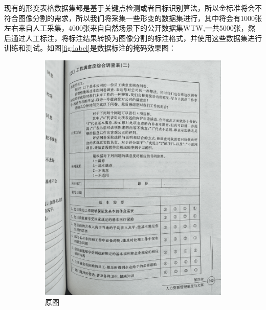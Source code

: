 \documentclass[UTF8,12pt, AutoFakeBold,fontset = founder]{ctexart}
\begin{document}
现有的形变表格数据集都是基于关键点检测或者目标识别算法，所以金标准将会不符合图像分割的需求，所以我们将采集一些形变的数据集进行，其中将会有1000张左右来自人工采集，4000张来自自然场景下的公开数据集WTW,一共5000张，然后通过人工标注，将标注结果转换为图像分割的标注格式，并使用这些数据集进行训练和测试。如图\ref{fig:label}是数据标注的掩码效果图：
\begin{figure}[H]
    \centering
    \begin{subfigure}[b]{0.45\textwidth}
        \includegraphics[width=\textwidth]{../images/origin.png}
        \caption{原图}
        \label{fig:origin}
    \end{subfigure}
    \hfill
    \begin{subfigure}[b]{0.45\textwidth}

\end{subfigure}
\end{figure}
\end{document}
